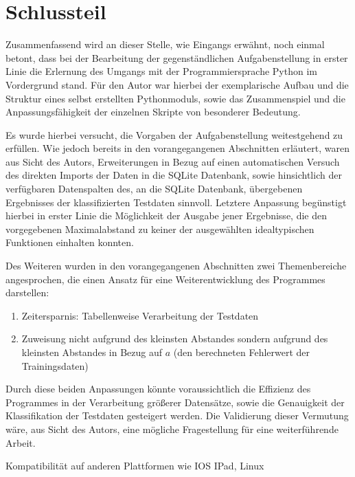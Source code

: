\chapter{Schlussteil}

Zusammenfassend wird an dieser Stelle, wie Eingangs erwähnt, noch einmal betont, dass bei der Bearbeitung der gegenständlichen Aufgabenstellung in erster Linie die Erlernung des Umgangs mit der Programmiersprache Python im Vordergrund stand. Für den Autor war hierbei der exemplarische Aufbau und die Struktur eines selbst erstellten Pythonmoduls, sowie das Zusammenspiel und die Anpassungsfähigkeit der einzelnen Skripte von besonderer Bedeutung.

Es wurde hierbei versucht, die Vorgaben der Aufgabenstellung weitestgehend zu erfüllen. Wie jedoch bereits in den vorangegangenen Abschnitten erläutert, waren aus Sicht des Autors, Erweiterungen in Bezug auf einen automatischen Versuch des direkten Imports der Daten in die SQLite Datenbank, sowie hinsichtlich der verfügbaren Datenspalten des, an die SQLite Datenbank, übergebenen Ergebnisses der klassifizierten Testdaten sinnvoll. Letztere Anpassung begünstigt hierbei in erster Linie die Möglichkeit der Ausgabe jener Ergebnisse, die den vorgegebenen Maximalabstand zu keiner der ausgewählten idealtypischen Funktionen einhalten konnten.

Des Weiteren wurden in den vorangegangenen Abschnitten zwei Themenbereiche angesprochen, die einen Ansatz für eine Weiterentwicklung des Programmes darstellen:

\begin{enumerate}
 \itemsep0pt
 \item Zeitersparnis: Tabellenweise Verarbeitung der Testdaten
 \item Zuweisung nicht aufgrund des kleinsten Abstandes sondern aufgrund des kleinsten Abstandes in Bezug auf $a$ (den berechneten Fehlerwert der Trainingsdaten)
\end{enumerate}

Durch diese beiden Anpassungen könnte voraussichtlich die Effizienz des Programmes in der Verarbeitung größerer Datensätze, sowie die Genauigkeit der Klassifikation der Testdaten gesteigert werden. Die Validierung dieser Vermutung wäre, aus Sicht des Autors, eine mögliche Fragestellung für eine weiterführende Arbeit. 

Kompatibilität \cite{dunn_getting_2017-1}auf anderen Plattformen wie IOS IPad, Linux   


